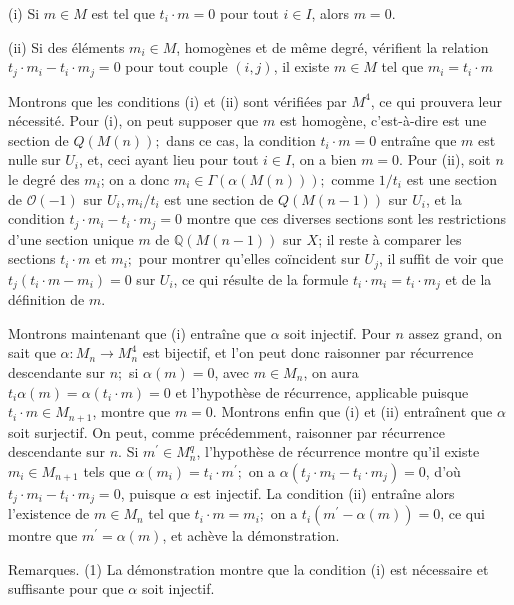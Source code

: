 (i) Si $m \in M$ est tel que $t_{i} \cdot m=0$ pour tout $i \in I$, alors $m=0$.

(ii) Si des éléments $m_{i} \in M$, homogènes et de même degré, vérifient la relation $t_{j} \cdot m_{i}-t_{i} \cdot m_{j}=0$ pour tout couple $(i, j)$, il existe $m \in M$ tel que $m_{i}=t_{i} \cdot m$

Montrons que les conditions (i) et (ii) sont vérifiées par $M^{4}$, ce qui prouvera leur nécessité. Pour (i), on peut supposer que $m$ est homogène, c'est-à-dire est une section de $Q(M(n)) ;$ dans ce cas, la condition $t_{i} \cdot m=0$ entraîne que $m$ est nulle sur $U_{i}$, et, ceci ayant lieu pour tout $i \in I$, on a bien $m=0$. Pour (ii), soit $n$ le degré des $m_{i}$; on a donc $m_{i} \in \Gamma(\alpha(M(n))) ;$ comme $1 / t_{i}$ est une section de $\mathcal{O}(-1)$ sur $U_{i}, m_{i} / t_{i}$ est une section de $Q(M(n-1))$ sur $U_{i}$, et la condition $t_{j} \cdot m_{i}-t_{i} \cdot m_{j}=0$ montre que ces diverses sections sont les restrictions d'une section unique $m$ de $\mathbb{Q}(M(n-1))$ sur $X$; il reste à comparer les sections $t_{i} \cdot m$ et $m_{i} ;$ pour montrer qu'elles coïncident sur $U_{j}$, il suffit de voir que $t_{j}\left(t_{i} \cdot m-m_{i}\right)=0$ sur $U_{i}$, ce qui résulte de la formule $t_{i} \cdot m_{i}=t_{i} \cdot m_{j}$ et de la définition de $m$.

Montrons maintenant que (i) entraîne que $\alpha$ soit injectif. Pour $n$ assez grand, on sait que $\alpha: M_{n} \rightarrow M_{n}^{4}$ est bijectif, et l'on peut donc raisonner par récurrence descendante sur $n ;$ si $\alpha(m)=0$, avec $m \in M_{n}$, on aura $t_{i} \alpha(m)=\alpha\left(t_{i} \cdot m\right)=0$ et l'hypothèse de récurrence, applicable puisque $t_{i} \cdot m \in M_{n+1}$, montre que $m=0$. Montrons enfin que (i) et (ii) entraînent que $\alpha$ soit surjectif. On peut, comme précédemment, raisonner par récurrence descendante sur $n$. Si $m^{\prime} \in M_{n}^{q}$, l'hypothèse de récurrence montre qu'il existe $m_{i} \in M_{n+1}$ tels que $\alpha\left(m_{i}\right)=t_{i} \cdot m^{\prime} ;$ on a $\alpha\left(t_{j} \cdot m_{i}-t_{i} \cdot m_{j}\right)=0$, d'où $t_{j} \cdot m_{i}-t_{i} \cdot m_{j}=0$, puisque $\alpha$ est injectif. La condition (ii) entraîne alors l'existence de $m \in M_{n}$ tel que $t_{i} \cdot m=m_{i} ;$ on a $t_{i}\left(m^{\prime}-\alpha(m)\right)=0$, ce qui montre que $m^{\prime}=\alpha(m)$, et achève la démonstration.

Remarques. (1) La démonstration montre que la condition (i) est nécessaire et suffisante pour que $\alpha$ soit injectif.

